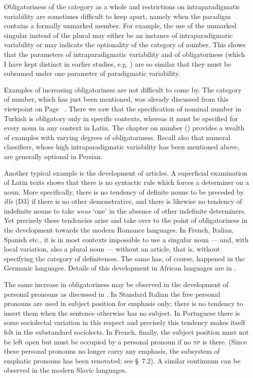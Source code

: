 Obligatoriness of the category as a whole and restrictions on intraparadigmatic variability are sometimes difficult to keep apart, namely when the paradigm contains a formally unmarked member. For example, the use of the unmarked singular instead of the plural may either be an instance of intraparadigmatic variability or may indicate the optionality of the category of number. This shows that the parameters of intraparadigmatic variability and of obligatoriness (which I have kept distinct in earlier studies, e.g. \citealt[234ff]{Lehmann1982b}) are so similar that they must be subsumed under one parameter of paradigmatic variability.

Examples of increasing obligatoriness are not difficult to come by. The category of number, which has just been mentioned, was already discussed from this viewpoint on Page~\pageref{page14}\chk%
. There we saw that the specification of nominal number in Turkish is obligatory only in specific contexts, whereas it must be specified for every noun in any context in Latin. The chapter on number () provides a wealth of examples with varying degrees of obligatoriness. Recall also that numeral classifiers, whose high intraparadigmatic variability has been mentioned above, are generally optional in Persian.

Another typical example is the development of articles. A superficial examination of Latin texts shows that there is no syntactic rule which forces a determiner on a noun. More specifically, there is no tendency of definite nouns to be preceded by \textit{ille} (D3) if there is no other demonstrative, and there is likewise no tendency of indefinite nouns to take \textit{unus} ‘one’ in the absence of other indefinite determiners. Yet precisely these tendencies arise and take over to the point of obligatoriness in the development towards the modern Romance languages. In French, Italian, Spanish etc., it is in most contexts impossible to use a singular noun — and, with local variation, also a plural noun — without an article, that is, without specifying the category of definiteness. The same has, of course, happened in the Germanic languages. Details of this development in African languages are in \citealt[§~3.3.--3.5]{Greenberg1978}.

The same increase in obligatoriness may be observed in the development of personal pronouns as discussed in . In Standard Italian the free personal pronouns are used in subject position for emphasis only; there is no tendency to insert them when the sentence otherwise has no subject. In Portuguese there is some sociolectal variation in this respect and precisely this tendency makes itself felt in the substandard sociolects. In French, finally, the subject position must not be left open but must be occupied by a personal pronoun if no \textsc{np} is there. (Since these personal pronouns no longer carry any emphasis, the subsystem of emphatic pronouns has been renovated; see §~7.2). A similar continuum can be observed in the modern Slavic languages.

